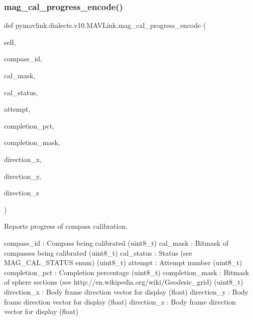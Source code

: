 \begin{DoxyVerb}
\begin{DoxyVerb}
\begin{DoxyVerb}
\begin{DoxyVerb}
\subsubsection{\texorpdfstring{mag\+\_\+cal\+\_\+progress\+\_\+encode()}{mag\_cal\_progress\_encode()}}
{\footnotesize\ttfamily def pymavlink.\+dialects.\+v10.\+M\+A\+V\+Link.\+mag\+\_\+cal\+\_\+progress\+\_\+encode (\begin{DoxyParamCaption}\item[{}]{self,  }\item[{}]{compass\+\_\+id,  }\item[{}]{cal\+\_\+mask,  }\item[{}]{cal\+\_\+status,  }\item[{}]{attempt,  }\item[{}]{completion\+\_\+pct,  }\item[{}]{completion\+\_\+mask,  }\item[{}]{direction\+\_\+x,  }\item[{}]{direction\+\_\+y,  }\item[{}]{direction\+\_\+z }\end{DoxyParamCaption})}

\begin{DoxyVerb}Reports progress of compass calibration.

compass_id                : Compass being calibrated (uint8_t)
cal_mask                  : Bitmask of compasses being calibrated (uint8_t)
cal_status                : Status (see MAG_CAL_STATUS enum) (uint8_t)
attempt                   : Attempt number (uint8_t)
completion_pct            : Completion percentage (uint8_t)
completion_mask           : Bitmask of sphere sections (see http://en.wikipedia.org/wiki/Geodesic_grid) (uint8_t)
direction_x               : Body frame direction vector for display (float)
direction_y               : Body frame direction vector for display (float)
direction_z               : Body frame direction vector for display (float)\end{DoxyVerb}
 \mbox{\label{classpymavlink_1_1dialects_1_1v10_1_1MAVLink_ada1a421e3ec9ea22243a17ee9284d924}} 

\end{DoxyVerb}
\end{DoxyVerb}
\end{DoxyVerb}
\end{DoxyVerb}
